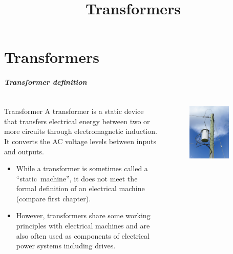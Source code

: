 \part{Transformers}
\title{Transformers}  
\date{}  
\frame{\titlepage} 

\begin{frame}
	\frametitle{Transformer definition}
    \begin{columns}
		\begin{column}{0.65\textwidth}
            \begin{varblock}{Transformer}
                A transformer is a static device that transfers electrical energy between two or more circuits through electromagnetic induction. It converts the AC voltage levels between inputs and outputs.   
            \end{varblock}
            \begin{itemize}
                \item While a transformer is sometimes called a ``static~machine'', it does not meet the formal definition of an electrical machine (compare first chapter).
                \item However, transformers share some working principles with electrical machines and are also often used as components of electrical power systems including drives.
            \end{itemize}
		\end{column}
        \hfill
		\begin{column}{0.35\textwidth}
			\begin{figure}
				\centering
				\includegraphics[width=0.75\textwidth]{fig/lec04/Transformer_rural_pole.jpg}

\end{figure}
\end{column}
\end{columns}
\end{frame}

